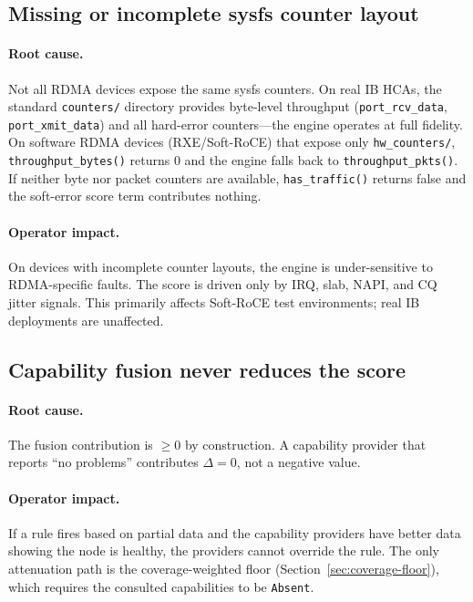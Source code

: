 \documentclass[11pt]{article}
\begin{document}
\subsection{Missing or incomplete sysfs counter layout}

\paragraph{Root cause.}
Not all RDMA devices expose the same sysfs counters. On real IB HCAs, the
standard \texttt{counters/} directory provides byte-level throughput
(\texttt{port\_rcv\_data}, \texttt{port\_xmit\_data}) and all hard-error
counters---the engine operates at full fidelity. On software RDMA devices
(RXE/Soft-RoCE) that expose only \texttt{hw\_counters/},
\texttt{throughput\_bytes()} returns 0 and the engine falls back to
\texttt{throughput\_pkts()}. If neither byte nor packet counters are
available, \texttt{has\_traffic()} returns false and the soft-error score
term contributes nothing.

\paragraph{Operator impact.}
On devices with incomplete counter layouts, the engine is under-sensitive to
RDMA-specific faults. The score is driven only by IRQ, slab, NAPI, and CQ
jitter signals. This primarily affects Soft-RoCE test environments; real IB
deployments are unaffected.

\subsection{Capability fusion never reduces the score}

\paragraph{Root cause.}
The fusion contribution is $\geq 0$ by construction. A capability provider
that reports ``no problems'' contributes $\Delta = 0$, not a negative value.

\paragraph{Operator impact.}
If a rule fires based on partial data and the capability providers have
better data showing the node is healthy, the providers cannot override the
rule. The only attenuation path is the coverage-weighted floor
(Section~\ref{sec:coverage-floor}), which requires the consulted capabilities
to be \texttt{Absent}.
\end{document}
